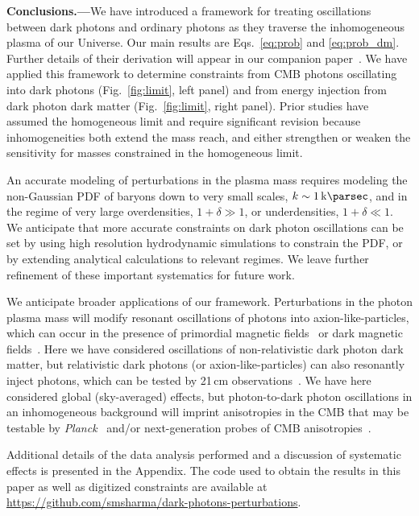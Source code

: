 \documentclass[prd,aps,10pt,nofootinbib,twocolumn,superscriptaddress,preprintnumbers,balancelastpage,longbibliography]{revtex4-1}
\begin{document}
\noindent
{\bf Conclusions.---}We have introduced a framework for treating oscillations between dark photons and ordinary photons as they traverse the inhomogeneous plasma of our Universe.  Our main results are Eqs.~\eqref{eq:prob} and \eqref{eq:prob_dm}.  Further details of their derivation will appear in our companion paper~\cite{OurLongPaper}.  We have applied this framework to determine constraints from CMB photons oscillating into dark photons (Fig.~\ref{fig:limit}, left panel) and from energy injection from dark photon dark matter (Fig.~\ref{fig:limit}, right panel).  Prior studies have assumed the homogeneous limit and require significant revision because inhomogeneities both extend the mass reach, and either strengthen or weaken the sensitivity for masses constrained in the homogeneous limit.

An accurate modeling of perturbations in the plasma mass requires modeling the non-Gaussian PDF of baryons down to very small scales, $k \sim \SI{1}{\kilo\parsec}$, and in the regime of very large overdensities, $1+\delta \gg1$, or underdensities, $1 + \delta \ll 1$.    We anticipate that more accurate constraints on dark photon oscillations can be set by using high resolution hydrodynamic simulations to constrain the PDF, or by extending analytical calculations to relevant regimes.  We leave further refinement of these important systematics for future work.

We anticipate broader applications of our framework.  Perturbations in the photon plasma mass will modify resonant oscillations of photons into axion-like-particles, which can occur in the presence of primordial magnetic fields~\cite{Mirizzi:2009nq} or dark magnetic fields~\cite{Choi:2019jwx}.  Here we have considered oscillations of non-relativistic dark photon dark matter, but relativistic dark photons (or axion-like-particles) can also resonantly inject photons, which can be tested by  21\,cm observations~\cite{Pospelov:2018kdh,Moroi:2018vci,Choi:2019jwx}.  We have here considered global (sky-averaged) effects, but photon-to-dark photon oscillations in an inhomogeneous background will imprint anisotropies in the CMB that may be testable by \emph{Planck}~\cite{Aghanim:2019ame} and/or next-generation probes of CMB anisotropies~\cite{Abazajian:2016yjj,Ade:2018sbj}.

Additional details of the data analysis performed and a discussion of systematic effects is presented in the Appendix. The code used to obtain the results in this paper as well as digitized constraints are available at \url{https://github.com/smsharma/dark-photons-perturbations}.
\end{document}
